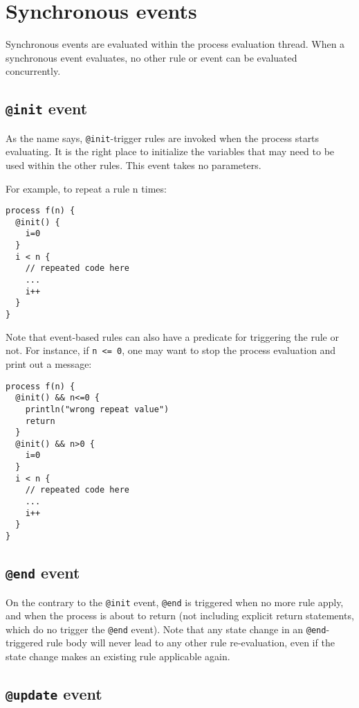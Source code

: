 \documentclass[11pt]{report}
\begin{document}
\section{Synchronous events}

Synchronous events are evaluated within the process evaluation thread. When a synchronous event evaluates, no other rule or event can be evaluated concurrently. 

\subsection{\texttt{@init} event}

As the name says, \texttt{@init}-trigger rules are invoked when the process starts evaluating. It is the right place to initialize the variables that may need to be used within the other rules. This event takes no parameters.

For example, to repeat a rule n times:

\begin{lstlisting}
process f(n) {
  @init() {
    i=0
  }
  i < n {
    // repeated code here
    ...
    i++
  }
}
\end{lstlisting}

Note that event-based rules can also have a predicate for triggering the rule or not. For instance, if \texttt{n <= 0}, one may want to stop the process evaluation and print out a message:

\begin{lstlisting}
process f(n) {
  @init() && n<=0 {
    println("wrong repeat value")
    return
  }
  @init() && n>0 {
    i=0
  }
  i < n {
    // repeated code here
    ...
    i++
  }
}
\end{lstlisting}

\subsection{\texttt{@end} event}

On the contrary to the \texttt{@init} event, \texttt{@end} is triggered when no more rule apply, and when the process is about to return (not including explicit return statements, which do no trigger the \texttt{@end} event). Note that any state change in an \texttt{@end}-triggered rule body will never lead to any other rule re-evaluation, even if the state change makes an existing rule applicable again.

\subsection{\texttt{@update} event}
\end{document}

